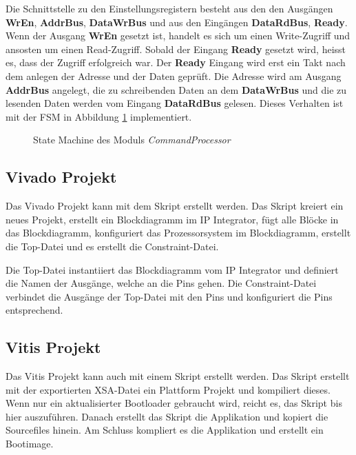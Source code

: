 \documentclass{article}
\begin{document}
Die Schnittstelle zu den Einstellungsregistern besteht aus den den Ausgängen \textbf{WrEn}, \textbf{AddrBus}, \textbf{DataWrBus} und aus den Eingängen \textbf{DataRdBus}, \textbf{Ready}.
Wenn der Ausgang \textbf{WrEn} gesetzt ist, handelt es sich um einen Write-Zugriff und ansosten um einen Read-Zugriff. Sobald der Eingang \textbf{Ready} gesetzt wird, heisst es, dass der Zugriff erfolgreich war. Der \textbf{Ready} Eingang wird erst ein Takt nach dem anlegen der Adresse und der Daten geprüft. Die Adresse wird am Ausgang \textbf{AddrBus} angelegt, die zu schreibenden Daten an dem \textbf{DataWrBus} und die zu lesenden Daten werden vom Eingang \textbf{DataRdBus} gelesen. Dieses Verhalten ist mit der FSM in Abbildung \ref{fig:fsm_command_processor} implementiert.

\begin{figure}[tb]
    \caption{State Machine des Moduls \textit{CommandProcessor}}
    \label{fig:fsm_command_processor}
\end{figure}

\subsection{Vivado Projekt}
Das Vivado Projekt kann mit dem Skript erstellt werden. Das Skript kreiert ein neues Projekt, erstellt ein Blockdiagramm im IP Integrator, fügt alle Blöcke in das Blockdiagramm, konfiguriert das Prozessorsystem im Blockdiagramm, erstellt die Top-Datei und es erstellt die Constraint-Datei.

Die Top-Datei instantiiert das Blockdiagramm vom IP Integrator und definiert die Namen der Ausgänge, welche an die Pins gehen. Die Constraint-Datei verbindet die Ausgänge der Top-Datei mit den Pins und konfiguriert die Pins entsprechend. 

\subsection{Vitis Projekt}
Das Vitis Projekt kann auch mit einem Skript erstellt werden. Das Skript erstellt mit der exportierten XSA-Datei ein Plattform Projekt und kompiliert dieses. Wenn nur ein aktualisierter Bootloader gebraucht wird, reicht es, das Skript bis hier auszuführen. Danach erstellt das Skript die Applikation und kopiert die Sourcefiles hinein. Am Schluss kompliert es die Applikation und erstellt ein Bootimage.
\end{document}

